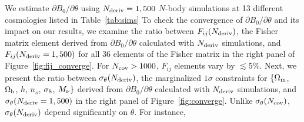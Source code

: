 We estimate $\partial B_0/\partial \theta$ using $N_{\rm deriv} = 1,500$ 
$N$-body simulations at 13 different cosmologies listed in Table~\ref{tab:sims} 
To check the convergence of $\partial B_0/\partial \theta$ and its impact on our 
results, we examine the ratio between $F_{ij}(N_{\rm deriv})$, the Fisher 
matrix element derived from $\partial B_0/\partial \theta$ calculated with 
$N_{\rm deriv}$ simulations, and $F_{ij}(N_{\rm deriv} = 1,500)$ for all 
36 elements of the Fisher matrix in the right panel of Figure~\ref{fig:fij_converge}.
For $N_{\rm cov} > 1000$, $F_{ij}$ elements vary by $\lesssim 5\%$. Next, we
present the ratio between $\sigma_\theta(N_{\rm deriv})$, the marginalized 
$1\sigma$ constraints for $\{\Omega_{\rm m}$, $\Omega_{\rm b}$, $h$, $n_s$, $\sigma_8$, $M_\nu\}$ 
derived from $\partial B_0/\partial \theta$ calculated with $N_{\rm deriv}$ 
simulations, and $\sigma_\theta(N_{\rm deriv} = 1,500)$ in the right panel 
of Figure~\ref{fig:converge}. Unlike $\sigma_\theta(N_{\rm cov})$, 
$\sigma_\theta(N_{\rm deriv})$ depend significantly on $\theta$. For instance, 

